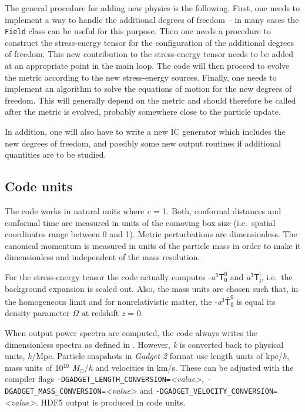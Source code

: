 \documentclass[a4paper,10pt]{article}
\begin{document}
\noindent The general procedure for adding new physics is the following. First, one needs to implement a way to handle the additional
degrees of freedom -- in many cases the \texttt{Field} class can be useful for this purpose. Then one needs a procedure to construct the
stress-energy tensor for the configuration of the additional degrees of freedom. This new contribution to the stress-energy tensor needs to
be added at an appropriate point in the main loop. The code will then proceed to evolve the metric according to the new stress-energy
sources. Finally, one needs to implement an algorithm to solve the equations of motion for the new degrees of freedom. This will generally
depend on the metric and should therefore be called after the metric is evolved, probably somewhere close to the particle update.

In addition, one will also have to write a new IC generator which includes the new degrees of freedom, and possibly some new output routines
if additional quantities are to be studied.

\subsection{Code units}
\label{sec:units}

The code works in natural units where \textit{c} = 1. Both, conformal distances and conformal time are measured in units of the comoving box
size (i.e.\ spatial coordinates range between 0 and 1). Metric perturbations are dimensionless. The canonical momentum is measured in units
of the particle mass in order to make it dimensionless and independent of the mass resolution.

For the stress-energy tensor the code actually computes -\textit{a}$^\mathsf{3} \mathsf{T^0_0}$ and \textit{a}$^\mathsf{3} \mathsf{T^i_j}$,
i.e.\ the background expansion is scaled out. Also, the mass units are chosen such that, in the homogeneous limit and for nonrelativistic
matter, the -\textit{a}$^\mathsf{3}\mathsf{\bar{T}^0_0}$ is equal its density parameter $\mathsf{\Omega}$ at redshift \textit{z} = 0.

When output power spectra are computed, the code always writes the dimensionless spectra as defined in \cite{Adamek:2015eda}. However,
\textit{k} is converted back to physical units, \textit{h}/Mpc. Particle snapshots in \textit{Gadget-2} format use length units of
kpc/\textit{h}, mass units of 10$^\mathsf{10}$ \textit{M}$_\odot$/\textit{h} and velocities in km/s. These can be adjusted with the compiler
flags \texttt{-DGADGET\_LENGTH\_CONVERSION=}\textit{<value>}, \texttt{-DGADGET\_MASS\_CONVERSION=}\textit{<value>} and
\texttt{-DGADGET\_VELOCITY\_CONVERSION=}\textit{<value>}. HDF5 output is produced in code units.
\end{document}
